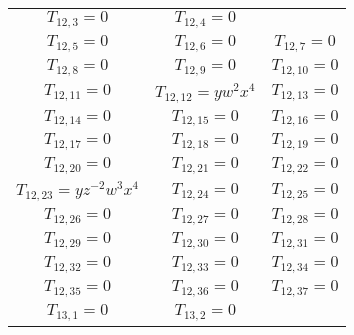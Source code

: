 \documentclass[12pt]{memoireuqam1.3}
\begin{document}
\begin{longtable}{|c|c|c|}
$T_{12,3}= 0$&

$T_{12,4}= 0$\\

$T_{12,5}= 0$&

$T_{12,6}= 0$&

$T_{12,7}= 0$\\

$T_{12,8}= 0$&

$T_{12,9}= 0$&

$T_{12,10}= 0$\\

$T_{12,11}= 0$&

$T_{12,12}= yw^2x^4$&

$T_{12,13}= 0$\\

$T_{12,14}= 0$&

$T_{12,15}= 0$&

$T_{12,16}= 0$\\

$T_{12,17}= 0$&

$T_{12,18}= 0$&

$T_{12,19}= 0$\\

$T_{12,20}= 0$&

$T_{12,21}= 0$&

$T_{12,22}= 0$\\

$T_{12,23}= yz^{-2}w^3x^4$&

$T_{12,24}= 0$&

$T_{12,25}= 0$\\

$T_{12,26}= 0$&

$T_{12,27}= 0$&

$T_{12,28}= 0$\\

$T_{12,29}= 0$&

$T_{12,30}= 0$&

$T_{12,31}= 0$\\

$T_{12,32}= 0$&

$T_{12,33}= 0$&

$T_{12,34}= 0$\\

$T_{12,35}= 0$&

$T_{12,36}= 0$&

$T_{12,37}= 0$\\

$T_{13,1}= 0$&

$T_{13,2}= 0$&


\end{longtable}
\end{document}
